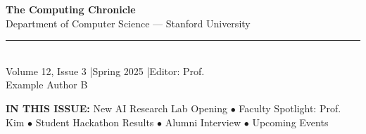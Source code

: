 \documentclass[10pt,a4paper]{article}
\begin{document}

\vspace*{-1.5cm}
\begin{center}
  {\color{white}\fontsize{36}{44}\selectfont\bfseries The Computing Chronicle}\\[6pt]
  {\color{white!80}\large Department of Computer Science --- Stanford University}\\[4pt]
  {\color{accent}\rule{6cm}{2pt}}\\[4pt]
  {\color{white!70}\small Volume 12, Issue 3 \quad|\quad Spring 2025 \quad|\quad Editor: Prof.\\ Example Author B}
\end{center}

\vspace{0.8cm}

\colorbox{lightbg}{%
\begin{minipage}{\dimexpr\textwidth-2\fboxsep}
\centering\small\color{darktext}
\textbf{IN THIS ISSUE:}\quad
New AI Research Lab Opening $\bullet$
Faculty Spotlight: Prof.\\ Kim $\bullet$
Student Hackathon Results $\bullet$
Alumni Interview $\bullet$
Upcoming Events
\end{minipage}}

\vspace{0.6cm}
\end{document}

